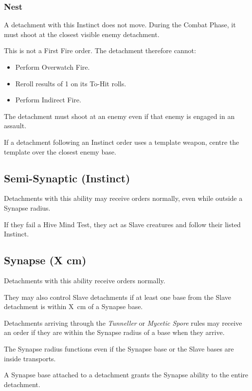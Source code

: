 \subsubsection{Nest}

A detachment with this Instinct does not move. During the Combat Phase, it must shoot at the closest visible enemy detachment.

This is not a First Fire order. The detachment therefore cannot:

\begin{itemize}
    \item Perform Overwatch Fire.
    \item Reroll results of 1 on its To-Hit rolls.
    \item Perform Indirect Fire.
\end{itemize}

The detachment must shoot at an enemy even if that enemy is engaged in an assault.

If a detachment following an Instinct order uses a template weapon, centre the template over the closest enemy base.

\subsection{Semi-Synaptic (Instinct)}

Detachments with this ability may receive orders normally, even while outside a Synapse radius.

If they fail a Hive Mind Test, they act as Slave creatures and follow their listed Instinct.

\subsection{Synapse (X cm)}

Detachments with this ability receive orders normally.

They may also control Slave detachments if at least one base from the Slave detachment is within X~cm of a Synapse base.

Detachments arriving through the \textit{Tunneller} or \textit{Mycetic Spore} rules may receive an order if they are within the Synapse radius of a base when they arrive.

The Synapse radius functions even if the Synapse base or the Slave bases are inside transports.

A Synapse base attached to a detachment grants the Synapse ability to the entire detachment.

